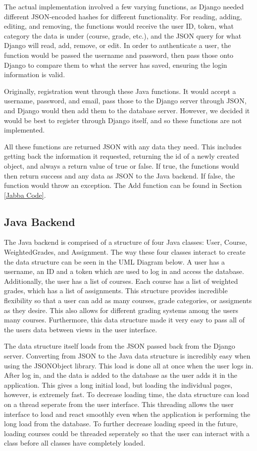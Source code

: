 \documentclass[a4paper]{article} %
\begin{document}
The actual implementation involved a few varying functions, as Django needed different JSON-encoded hashes for different functionality. For reading, adding, editing, and removing, the functions would receive the user ID, token, what category the data is under (course, grade, etc.), and the JSON query for what Django will read, add, remove, or edit. In order to authenticate a user, the function would be passed the username and password, then pass those onto Django to compare them to what the server has saved, ensuring the login information is valid.

Originally, registration went through these Java functions. It would accept a username, password, and email, pass those to the Django server through JSON, and Django would then add them to the database server. However, we decided it would be best to register through Django itself, and so these functions are not implemented.

All these functions are returned JSON with any data they need. This includes getting back the information it requested, returning the id of a newly created object, and always a return value of true or false. If true, the functions would then return success and any data as JSON to the Java backend. If false, the function would throw an exception. The Add function can be found in Section \ref{Jabba Code}.

\subsection{Java Backend}
The Java backend is comprised of a structure of four Java classes: User, Course, WeightedGrades, and Assignment. The way these four classes interact to create the data structure can be seen in the UML Diagram below. A user has a username, an ID and a token which are used to log in and access the database. Additionally, the user has a list of courses. Each course has a list of weighted grades, which has a list of assignments. This structure provides incredible flexibility so that a user can add as many courses, grade categories, or assigments as they desire. This also allows for different grading systems among the users many courses. Furthermore, this data structure made it very easy to pass all of the users data between views in the user interface.

The data structure itself loads from the JSON passed back from the Django server.  Converting from JSON to the Java data structure is incredibly easy when using the JSONObject library. This load is done all at once when the user logs in. After log in, and the data is added to the database as the user adds it in the application. This gives a long initial load, but loading the individual pages, however, is extremely fast. To decrease loading time, the data structure can load on a thread seperate from the user interface. This threading allows the user interface to load and react smoothly even when the application is performing the long load from the database. To further decrease loading speed in the future, loading courses could be threaded seperately so that the user can interact with a class before all classes have completely loaded.
\end{document}

